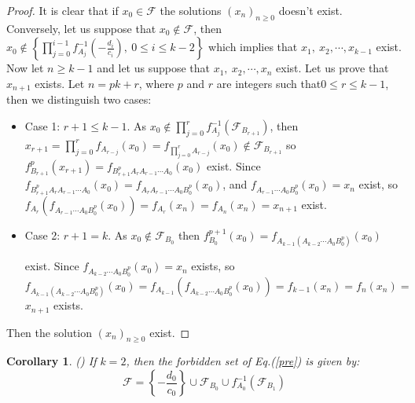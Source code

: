 \documentclass[11pt]{amsart}
\newtheorem{cor}[thm]{Corollary}
\theoremstyle{definition}
\theoremstyle{remark}
\theoremstyle{example}
\numberwithin{equation}{section}
\begin{document}
\begin{proof}
It is clear that if $x_0\in \mathcal{F}$ the solutions $(x_n)_{n\geq0}$ doesn't  exist.\\
Conversely, let us suppose that $ x_0\not\in \mathcal{F}$, then \\$x_0\not\in \left\{\prod\limits_{j=0}^{i-1}f_{A_j}^{-1}\left(-\frac{d_i}{c_i}\right), \  0\leq i\leq k-2\right\}$ which implies that $x_1,\ x_2,\cdots,x_{k-1}$ exist. Now let $n\geq k-1$ and let us suppose that $x_1, \ x_2,\cdots,x_n$ exist.
Let us prove that $x_{n+1}$ exists. Let $n=pk+r$, where $p$ and $r$ are integers such that$0\leq r\leq k-1$, then we distinguish two cases:
\medskip
\begin{itemize}[leftmargin=*]
\item Case 1: $r+1\leq k-1$. As $x_0\not\in \prod\limits_{j=0}^{r}f_{A_j}^{-1}(\mathcal{F}_{B_{r+1}})$, then $x_{r+1}=\prod\limits_{j=0}^{r}f_{A_{r-j}}(x_0)=
    f_{\prod\limits_{j=0}^{r}A_{r-j}}(x_0)\not\in\mathcal{F}_{B_{r+1}}$ so $f_{B_{r+1}}^p(x_{r+1})=f_{B_{r+1}^p A_{r}A_{r-1}\cdots A_0}(x_0)$ exist. Since
\medskip
     $f_{B_{r+1}^p A_{r}A_{r-1}\cdots A_0}(x_0)=f_{A_{r}A_{r-1}\cdots A_0B_0^p}(x_0)$, and $f_{A_{r-1}\cdots A_0B_0^p}(x_0)=x_n$ exist,
\medskip
      so $f_{A_r}(f_{A_{r-1}\cdots A_0B_0^p}(x_0))=f_{A_r}(x_n)=f_{A_n}(x_n)=x_{n+1}$ exist.
\vspace{0.2cm}
\item Case 2: $r+1=k$. As $x_0\not\in\mathcal{F}_{B_0}$ then
$f_{B_0}^{p+1}(x_0)=f_{A_{k-1}(A_{k-2}\cdots A_0B_0^p)}(x_0)$
\vspace{2mm}

\noindent
exist. Since $f_{A_{k-2}\cdots A_0B_0^p}(x_0)=x_n$ exists, so\\
\medskip
$f_{A_{k-1}(A_{k-2}\cdots A_0B_0^p)}(x_0)=f_{A_{k-1}}(f_{A_{k-2}\cdots A_0B_0^p}(x_0))=f_{k-1}(x_n)=f_n(x_n)=$
\vspace{2mm}
\noindent
$x_{n+1}$ exists.
\end{itemize}
Then the solution $(x_n)_{n\geq0}$ exist.
\end{proof}
\medskip
\begin{cor}\rm{(\cite{1})
If $k=2$, then the forbidden set of Eq.(\ref{pre}) is given by:
$$\mathcal{F}=\left\{-\frac{d_0}{c_0}\right\}\cup\mathcal{F}_{B_0}\cup
f_{A_0}^{-1}(\mathcal{F}_{B_1})$$ }
\end{cor}
\medskip
\end{document}
